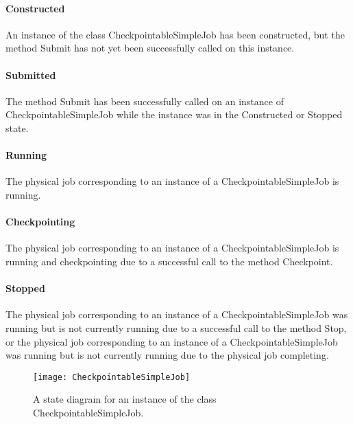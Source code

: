 \documentclass[$Date: 2003/06/26 19:29:31 $]{glabarticle}
\begin{document}
\paragraph{Constructed} 

An instance of the class CheckpointableSimpleJob has been constructed,
but the method Submit has not yet been successfully called on this
instance.

\paragraph{Submitted} 

The method Submit has been successfully called on an instance of
CheckpointableSimpleJob while the instance was in the Constructed or
Stopped state.

\paragraph{Running} 

The physical job corresponding to an instance of a
CheckpointableSimpleJob is running.

\paragraph{Checkpointing} 

The physical job corresponding to an instance of a
CheckpointableSimpleJob is running and checkpointing due to a
successful call to the method Checkpoint.

\paragraph{Stopped} 

The physical job corresponding to an instance of a
CheckpointableSimpleJob was running but is not currently running due
to a successful call to the method Stop, or the physical job
corresponding to an instance of a CheckpointableSimpleJob was running
but is not currently running due to the physical job completing. \\

\begin{figure}[h]  
\begin{center}
\texttt{[image: CheckpointableSimpleJob]}
\end{center}      
\caption{A state diagram for an instance of the class CheckpointableSimpleJob.}
\label{Fig:CheckpointableSimpleJobStateDiagram}
\end{figure}
\end{document}
